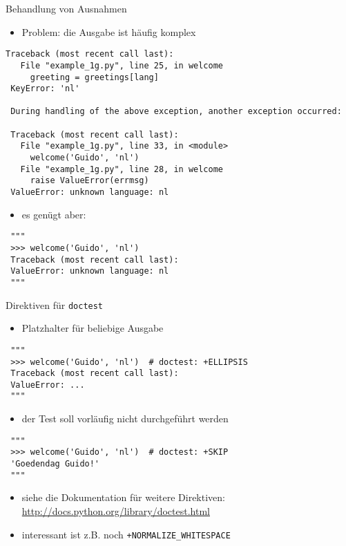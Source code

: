 \documentclass[t, utf8x, 10pt]{beamer}
\begin{document}
\begin{frame}[fragile]{Behandlung von Ausnahmen}
 \begin{itemize}
  \item Problem: die Ausgabe ist häufig komplex
 \end{itemize}
 \begin{footnotesize}
  \begin{lstlisting}[language={}]
 Traceback (most recent call last):
   File "example_1g.py", line 25, in welcome
     greeting = greetings[lang]
 KeyError: 'nl'

 During handling of the above exception, another exception occurred:

 Traceback (most recent call last):
   File "example_1g.py", line 33, in <module>
     welcome('Guido', 'nl')
   File "example_1g.py", line 28, in welcome
     raise ValueError(errmsg)
 ValueError: unknown language: nl
  \end{lstlisting}
 \end{footnotesize}
 \begin{itemize}
  \item es genügt aber:
 \end{itemize}
 \begin{footnotesize}
  \begin{lstlisting}
 """
 >>> welcome('Guido', 'nl')
 Traceback (most recent call last):
 ValueError: unknown language: nl
 """
  \end{lstlisting}
 \end{footnotesize}
\end{frame}


\begin{frame}[fragile]{Direktiven für \texttt{doctest}}
 \begin{itemize}
  \item Platzhalter für beliebige Ausgabe
 \end{itemize}
 \begin{footnotesize}
  \begin{lstlisting}
 """
 >>> welcome('Guido', 'nl')  # doctest: +ELLIPSIS
 Traceback (most recent call last):
 ValueError: ...
 """
  \end{lstlisting}
 \end{footnotesize}

 \begin{itemize}
  \item der Test soll vorläufig nicht durchgeführt werden
 \end{itemize}
 \begin{footnotesize}
  \begin{lstlisting}
 """
 >>> welcome('Guido', 'nl')  # doctest: +SKIP
 'Goedendag Guido!'
 """
  \end{lstlisting}
 \end{footnotesize}

 \begin{itemize}
  \item siehe die Dokumentation für weitere Direktiven:
	\url{http://docs.python.org/library/doctest.html}
  \item interessant ist z.B. noch \texttt{+NORMALIZE\_WHITESPACE}
 \end{itemize}
\end{frame}
\end{document}
